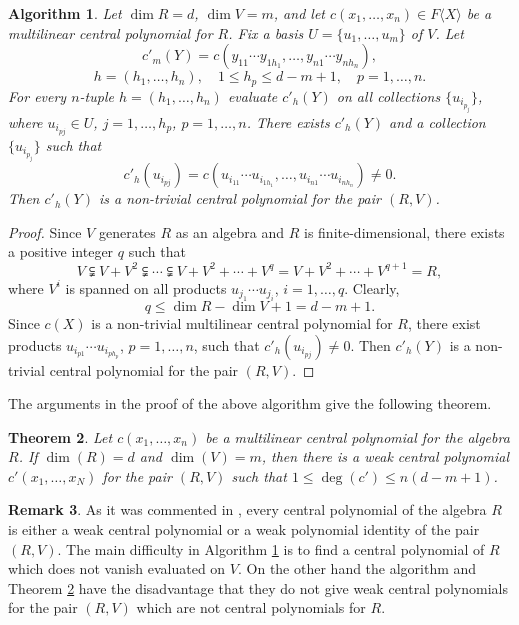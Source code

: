 \documentclass[10]{amsart}
\newtheorem{theorem}{Theorem}[section]
\newtheorem{algorithm}[theorem]{Algorithm}
\theoremstyle{definition}
\newtheorem{remark}[theorem]{Remark}
\begin{document}
\begin{algorithm}\label{construction of central polynomial}
Let $\dim R=d$, $\dim V=m$, and let $c(x_1,\ldots,x_n)\in F\langle X\rangle$ be a multilinear central polynomial for $R$.
Fix a basis $U=\{u_1,\ldots,u_m\}$ of $V$. Let
\[
c'_m(Y)=c(y_{11}\cdots y_{1h_1},\ldots,y_{n1}\cdots y_{nh_n}),
\]
\[
h=(h_1,\ldots,h_n), \quad 1\le h_p\le d-m+1,\quad p=1,\ldots,n.
\]
For every $n$-tuple $h=(h_1,\ldots,h_n)$ evaluate $c'_h(Y)$ on all collections $\{u_{i_{p_j}}\}$, where
$u_{i_{pj}}\in U$, $j=1,\ldots,h_p$, $p=1,\ldots,n$.
There exists $c'_h(Y)$ and a collection $\{u_{i_{p_j}}\}$ such that
\[
c'_h(u_{i_{pj}})=c(u_{i_{11}}\cdots u_{i_{1h_1}},\ldots,u_{i_{n1}}\cdots u_{i_{nh_n}})\not=0.
\]
Then $c'_h(Y)$ is a non-trivial central polynomial for the pair $(R,V)$.
\end{algorithm}

\begin{proof} Since $V$ generates $R$ as an algebra and $R$ is finite-dimensional, there exists a positive integer $q$ such that
\[
V\subsetneqq V+V^2\subsetneqq\cdots\subsetneqq V+V^2+\cdots+V^q=V+V^2+\cdots+V^{q+1}=R,
\]
where $V^i$ is spanned on all products $u_{j_1}\cdots u_{j_i}$, $i=1,\ldots,q$. Clearly,
\[
q\leq \dim R-\dim V+1=d-m+1.
\]
Since $c(X)$ is a non-trivial multilinear central polynomial for $R$, there exist products $u_{i_{p1}}\cdots u_{i_{ph_p}}$, $p=1,\ldots,n$,
such that $c'_h(u_{i_{pj}})\not=0$. Then $c'_h(Y)$ is a non-trivial central polynomial for the pair $(R,V)$.
\end{proof}

The arguments in the proof of the above algorithm give the following theorem.

\begin{theorem}\label{main theorem}
Let $c(x_1,\ldots,x_n)$ be a multilinear central polynomial for the algebra $R$.
If $\dim(R)=d$ and $\dim(V)=m$, then there is a weak central polynomial $c'(x_1,\ldots,x_N)$
for the pair $(R,V)$ such that $1\leq \deg(c')\leq n(d-m+1)$.
\end{theorem}

\begin{remark}\label{Remark 1}
As it was commented in \cite{D2}, every central polynomial of the algebra $R$ is either a weak central polynomial or a weak polynomial identity of the pair $(R,V)$.
The main difficulty in Algorithm \ref{construction of central polynomial} is to find a central polynomial of $R$ which does not vanish evaluated on $V$.
On the other hand the algorithm and Theorem \ref{main theorem} have the disadvantage that they do not give weak central polynomials
for the pair $(R,V)$ which are not central polynomials for $R$.
\end{remark}
\end{document}
